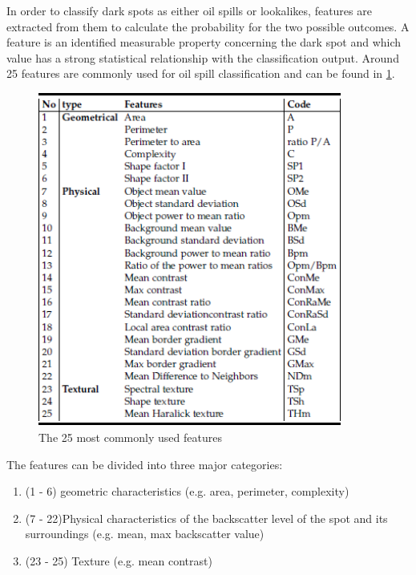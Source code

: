 In order to classify dark spots as either oil spills or lookalikes, features are extracted from them to calculate the probability for the two possible outcomes. A feature is an identified measurable property concerning the dark spot and which value has a strong statistical relationship with the classification output. Around 25 features are commonly used for oil spill classification and can be found in \ref{fig:featuretable}.

\begin{figure}[H]
	\centering
    \includegraphics[width=100mm,scale=1]{./img/featurestable.png}
    \caption{\footnotesize{The 25 most commonly used features\cite{Topouzelis201268}}}
    \label{fig:featuretable}
\end{figure}

The features can be divided into three major categories\cite{Brekke200595}:
\begin{enumerate}
\item (1 - 6) geometric characteristics (e.g. area, perimeter, complexity)
\item (7 - 22)Physical characteristics of the backscatter level of the spot and its surroundings (e.g. mean, max backscatter value)
\item (23 - 25) Texture (e.g. mean contrast)
\end{enumerate}

